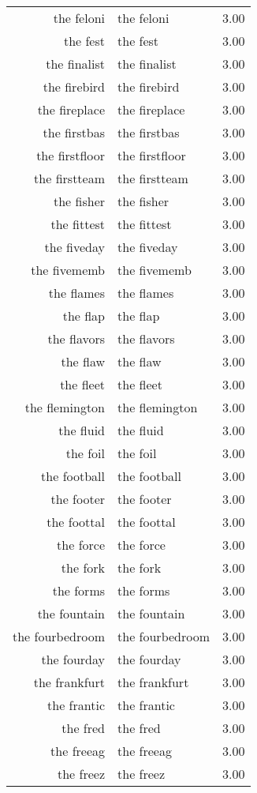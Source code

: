 \begin{table}[ht]
\begin{tabular}{rlr}
  the feloni & the feloni & 3.00 \\ 
  the fest & the fest & 3.00 \\ 
  the finalist & the finalist & 3.00 \\ 
  the firebird & the firebird & 3.00 \\ 
  the fireplace & the fireplace & 3.00 \\ 
  the firstbas & the firstbas & 3.00 \\ 
  the firstfloor & the firstfloor & 3.00 \\ 
  the firstteam & the firstteam & 3.00 \\ 
  the fisher & the fisher & 3.00 \\ 
  the fittest & the fittest & 3.00 \\ 
  the fiveday & the fiveday & 3.00 \\ 
  the fivememb & the fivememb & 3.00 \\ 
  the flames & the flames & 3.00 \\ 
  the flap & the flap & 3.00 \\ 
  the flavors & the flavors & 3.00 \\ 
  the flaw & the flaw & 3.00 \\ 
  the fleet & the fleet & 3.00 \\ 
  the flemington & the flemington & 3.00 \\ 
  the fluid & the fluid & 3.00 \\ 
  the foil & the foil & 3.00 \\ 
  the football & the football & 3.00 \\ 
  the footer & the footer & 3.00 \\ 
  the foottal & the foottal & 3.00 \\ 
  the force & the force & 3.00 \\ 
  the fork & the fork & 3.00 \\ 
  the forms & the forms & 3.00 \\ 
  the fountain & the fountain & 3.00 \\ 
  the fourbedroom & the fourbedroom & 3.00 \\ 
  the fourday & the fourday & 3.00 \\ 
  the frankfurt & the frankfurt & 3.00 \\ 
  the frantic & the frantic & 3.00 \\ 
  the fred & the fred & 3.00 \\ 
  the freeag & the freeag & 3.00 \\ 
  the freez & the freez & 3.00 \\ 

\end{tabular}
\end{table}

